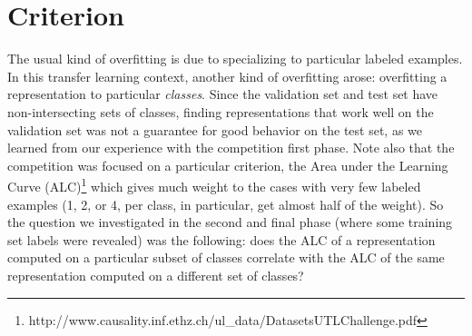 

\section{Criterion}\label{sec:criterion}

The usual kind of overfitting is due to specializing to particular labeled
examples. In this transfer learning context, another kind of overfitting arose:
overfitting a representation to particular {\em classes}. Since the validation
set and test set have non-intersecting sets of classes, finding representations
that work well on the validation set was not a guarantee for good behavior
on the test set, as we learned from our experience with the competition first phase.
Note also that the competition was focused on a particular criterion,
the Area under the Learning Curve
(ALC)\footnote{http://www.causality.inf.ethz.ch/ul\_data/DatasetsUTLChallenge.pdf}
which gives much weight to the cases with very few labeled examples (1, 2, or 4,
per class, in particular, get almost half of the weight). So the question we
investigated in the second and final phase (where some training set labels
were revealed) was the following: does the ALC of a representation computed
on a particular subset of classes correlate with the ALC of the same
representation computed on a different set of classes?

